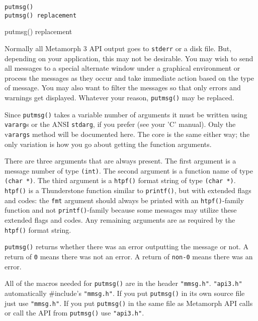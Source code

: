 \SEE
\begin{verbatim}
putmsg()
putmsg() replacement
\end{verbatim}

\NAME
{putmsg() replacement}

\DESCRIPTION

Normally all Metamorph 3 API output goes to \verb`stderr` or a disk file.
But, depending on your application, this may not be desirable.
You may wish to send all messages to a special alternate window
under a graphical environment or process the messages as they
occur and take immediate action based on the type of message.  You
may also want to filter the messages so that only errors and
warnings get displayed.  Whatever your reason, \verb`putmsg()` may be
replaced.

Since \verb`putmsg()` takes a variable number of arguments it must be
written using \verb`vararg`s or the ANSI \verb`stdarg`, if you prefer (see your
'C' manual).  Only the v\verb`arargs` method will be documented here.
The core is the same either way; the only variation is how you go
about getting the function arguments.

There are three arguments that are always present.  The first
argument is a message number of type \verb`(int)`.  The second argument
is a function name of type \verb`(char *)`.  The third argument is a
\verb`htpf()` format string of type \verb`(char *)`.  \verb`htpf()`
is a Thunderstone function similar to \verb`printf()`, but with extended
flags and codes: the \verb`fmt` argument should always be printed with
an \verb`htpf()`-family function and not \verb`printf()`-family because
some messages may utilize these extended flags and codes.
Any remaining arguments are as required by the \verb`htpf()` format string.

\verb`putmsg()` returns whether there was an error outputting the message
or not.  A return of \verb`0` means there was not an error.  A return of
\verb`non-0` means there was an error.

All of the macros needed for \verb`putmsg()` are in the header \verb`"mmsg.h"`.
\verb`"api3.h"` automatically \#include's \verb`"mmsg.h"`.  If you put \verb`putmsg()`
in its own source file just use \verb`"mmsg.h"`.  If you put \verb`putmsg()` in
the same file as Metamorph API calls or call the API from \verb`putmsg()`
use \verb`"api3.h"`.

